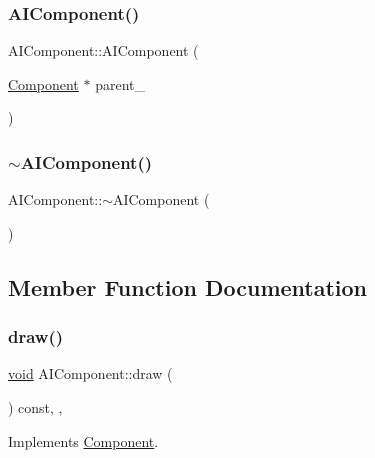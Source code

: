 \subsubsection{\texorpdfstring{A\+I\+Component()}{AIComponent()}}
{\footnotesize\ttfamily A\+I\+Component\+::\+A\+I\+Component (\begin{DoxyParamCaption}\item[{\hyperlink{classComponent}{Component} $\ast$}]{parent\+\_\+ }\end{DoxyParamCaption})}

\mbox{\label{classAIComponent_a0ffc6db0d1cb5720b8aaef8ec28f4efe}} 
\subsubsection{\texorpdfstring{$\sim$\+A\+I\+Component()}{~AIComponent()}}
{\footnotesize\ttfamily A\+I\+Component\+::$\sim$\+A\+I\+Component (\begin{DoxyParamCaption}{ }\end{DoxyParamCaption})}



\subsection{Member Function Documentation}
\mbox{\label{classAIComponent_ab4d6c5c6043cfa275e4edce5b575a8a9}} 
\subsubsection{\texorpdfstring{draw()}{draw()}}
{\footnotesize\ttfamily \hyperlink{imgui__impl__opengl3__loader_8h_ac668e7cffd9e2e9cfee428b9b2f34fa7}{void} A\+I\+Component\+::draw (\begin{DoxyParamCaption}{ }\end{DoxyParamCaption}) const\hspace{0.3cm}{\ttfamily [inline]}, {\ttfamily [override]}, {\ttfamily [virtual]}}



Implements \hyperlink{classComponent_a8f45309003f02191f2bcc8864e8e9ecf}{Component}.

